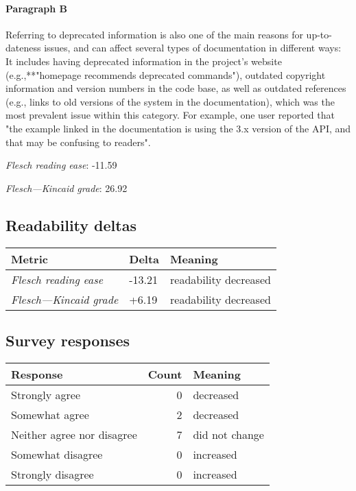 \paragraph{Paragraph B}
Referring to deprecated information is also one of the main reasons for up-to-dateness issues, and can affect several types of documentation in different ways: It includes having deprecated information in the project's website (e.g.,**"homepage recommends deprecated commands"), outdated copyright information and version numbers in the code base, as well as outdated references (e.g., links to old versions of the system in the documentation), which was the most prevalent issue within this category. For example, one user reported that "the example linked in the documentation is using the 3.x version of the API, and that may be confusing to readers".\par\medskip
\emph{Flesch reading ease}: -11.59\par
\emph{Flesch---Kincaid grade}: 26.92

\subsection{Readability deltas}

\begin{tabular}{lll}
\toprule
               \textbf{Metric} & \textbf{Delta} &       \textbf{Meaning} \\
\midrule
    \emph{Flesch reading ease} &         -13.21 &  readability decreased \\
 \emph{Flesch---Kincaid grade} &          +6.19 &  readability decreased \\
\bottomrule
\end{tabular}

\subsection{Survey responses}
\begin{tabular}{lrl}
\toprule
          \textbf{Response} &  \textbf{Count} & \textbf{Meaning} \\
\midrule
             Strongly agree &               0 &        decreased \\
             Somewhat agree &               2 &        decreased \\
 Neither agree nor disagree &               7 &   did not change \\
          Somewhat disagree &               0 &        increased \\
          Strongly disagree &               0 &        increased \\
\bottomrule
\end{tabular}

